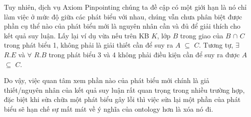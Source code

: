 		\hspace*{0.05\textwidth} Tuy nhiên, dịch vụ Axiom Pinpointing chúng ta đề cập có một giới hạn là nó chỉ làm việc ở mức độ giữa các phát biểu với nhau, chúng vẫn chưa phân biệt được phần cụ thể nào của phát biểu mới là nguyên nhân cần và đủ để giải thích cho kết quả suy luận. Lấy lại ví dụ vừa nếu trên KB $K$, lớp $B$ trong giao của $B$ $\cap$ $C$ trong phát biểu 1, không phải là giải thiết cần để suy ra $A$ $\subseteq$ $C$. Tương tự, $\exists$ $R.E$ và $\forall$ $R.B$ trong phát biểu 3 và 4 không phải điều kiện cần để suy ra được $A$ $\subseteq$ $C$. 
		
		\hspace{0.05\textwidth} Do vậy, việc quan tâm xem phần nào của phát biểu mới chính là giả thiết/nguyên nhân của kết quả suy luận rất quan trọng trong nhiều trường hợp, đặc biệt khi sửa chữa một phát biểu gây lỗi thì việc sửa lại một phần của phát biểu sẽ hạn chế sự mất mát về ý nghĩa của ontology hơn là xóa nó đi.
		
